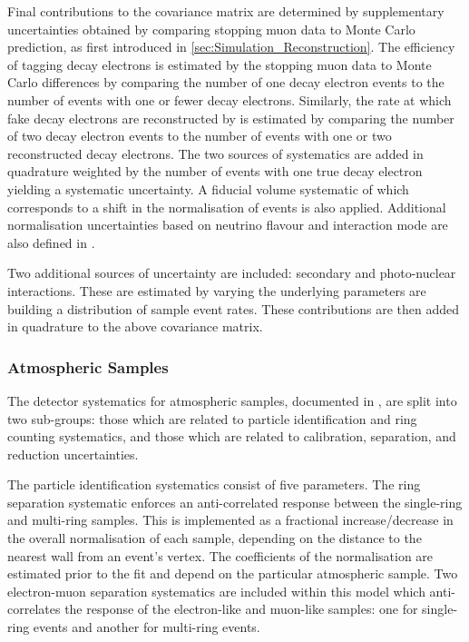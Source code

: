Final contributions to the covariance matrix are determined by supplementary uncertainties obtained by comparing stopping muon data to Monte Carlo prediction, as first introduced in \autoref{sec:Simulation_Reconstruction}. The efficiency of tagging decay electrons is estimated by the stopping muon data to Monte Carlo differences by comparing the number of one decay electron events to the number of events with one or fewer decay electrons. Similarly, the rate at which fake decay electrons are reconstructed by \fq is estimated by comparing the number of two decay electron events to the number of events with one or two reconstructed decay electrons. The two sources of systematics are added in quadrature weighted by the number of events with one true decay electron yielding a  systematic uncertainty.
A fiducial volume systematic of  which corresponds to a  shift in the normalisation of events is also applied. Additional normalisation uncertainties based on neutrino flavour and interaction mode are also defined in \cite{t2k_tn_399, t2k_tn_186, t2k_tn_107}.

Two additional sources of uncertainty are included: secondary and photo-nuclear interactions. These are estimated by varying the underlying parameters are building a distribution of sample event rates. These contributions are then added in quadrature to the above covariance matrix.


\subsubsection{Atmospheric Samples}
\label{sec:SelsAndSysts_Systs_FDAtm}

The detector systematics for atmospheric samples, documented in \cite{Jiang2019-iw}, are split into two sub-groups: those which are related to particle identification and ring counting systematics, and those which are related to calibration, separation, and reduction uncertainties.

The particle identification systematics consist of five parameters. The ring separation systematic enforces an anti-correlated response between the single-ring and multi-ring samples. This is implemented as a fractional increase/decrease in the overall normalisation of each sample, depending on the distance to the nearest wall from an event's vertex. The coefficients of the normalisation are estimated prior to the fit and depend on the particular atmospheric sample. Two electron-muon separation systematics are included within this model which anti-correlates the response of the electron-like and muon-like samples: one for single-ring events and another for multi-ring events.

